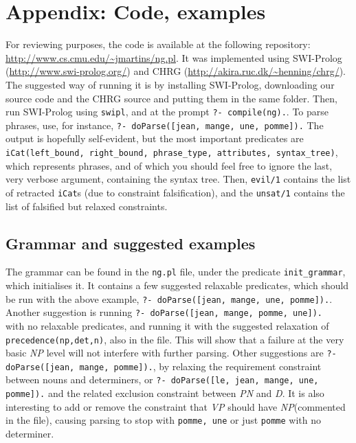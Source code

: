 \documentclass{llncs}
\newcommand{\PN}{\textit{PN}\xspace}
\newcommand{\NP}{\textit{NP}\xspace}
\newcommand{\VP}{\textit{VP}\xspace}
\newcommand{\D}{\textit{D}\xspace}
\begin{document}
 


%
%


\newpage
\appendix
\section{Appendix: Code, examples}
For reviewing purposes, the code is available at the following repository: \url{http://www.cs.cmu.edu/~jmartins/ng.pl}. It was implemented using SWI-Prolog (\url{http://www.swi-prolog.org/}) and CHRG (\url{http://akira.ruc.dk/~henning/chrg/}).
The suggested way of running it is by installing SWI-Prolog, downloading our source code and the CHRG source and putting them in the same folder. Then, run SWI-Prolog using \texttt{swipl}, and at the prompt \texttt{?- compile(ng).}. To parse phrases, use, for instance, \texttt{?- doParse([jean, mange, une, pomme]).}
The output is hopefully self-evident, but the most important predicates are\\
\texttt{iCat(left\_bound, right\_bound, phrase\_type, attributes, syntax\_tree)},\\
which represents phrases, and of which you should feel free to ignore the last, very verbose argument, containing the syntax tree. Then, \texttt{evil/1} contains the list of retracted \texttt{iCat}s (due to constraint falsification), and the \texttt{unsat/1} contains the list of falsified but relaxed constraints.
\subsection{Grammar and suggested examples}
The grammar can be found in the \texttt{ng.pl} file, under the predicate \texttt{init\_grammar}, which initialises it. It contains a few suggested relaxable predicates, which should be run with the above example, \texttt{?- doParse([jean, mange, une, pomme]).}.
Another suggestion is running \texttt{?- doParse([jean, mange, pomme, une]).} \\ with no relaxable predicates, and running it with the suggested relaxation of \\ 
\texttt{precedence(np,det,n)}, also in the file. This will show that a failure at the very basic \NP level will not interfere with further parsing.
Other suggestions are \texttt{?- doParse([jean, mange, pomme]).}, by relaxing the requirement constraint between nouns and determiners, or \texttt{?- doParse([le, jean, mange, une, pomme]).} and the related exclusion constraint between \PN and \D.
It is also interesting to add or remove the constraint that \VP should have \NP (commented in the file), causing parsing to stop with \texttt{pomme, une} or just \texttt{pomme} with no determiner.
\end{document}
